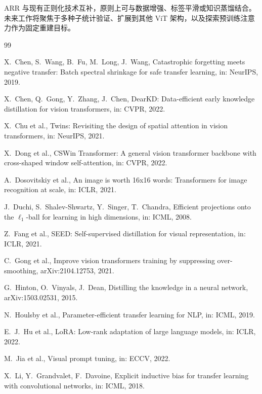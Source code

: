 \documentclass[preprint,12pt]{elsarticle}
\begin{document}
ARR 与现有正则化技术互补，原则上可与数据增强、标签平滑或知识蒸馏结合。未来工作将聚焦于多种子统计验证、扩展到其他 ViT 架构，以及探索预训练注意力作为固定重建目标。

\begin{thebibliography}{99}

 X.~Chen, S.~Wang, B.~Fu, M.~Long, J.~Wang, Catastrophic forgetting meets negative transfer: Batch spectral shrinkage for safe transfer learning, in: NeurIPS, 2019.

 X.~Chen, Q.~Gong, Y.~Zhang, J.~Chen, DearKD: Data-efficient early knowledge distillation for vision transformers, in: CVPR, 2022.

 X.~Chu et al., Twins: Revisiting the design of spatial attention in vision transformers, in: NeurIPS, 2021.

 X.~Dong et al., CSWin Transformer: A general vision transformer backbone with cross-shaped window self-attention, in: CVPR, 2022.

 A.~Dosovitskiy et al., An image is worth 16x16 words: Transformers for image recognition at scale, in: ICLR, 2021.

 J.~Duchi, S.~Shalev-Shwartz, Y.~Singer, T.~Chandra, Efficient projections onto the $\ell_1$-ball for learning in high dimensions, in: ICML, 2008.

 Z.~Fang et al., SEED: Self-supervised distillation for visual representation, in: ICLR, 2021.

 C.~Gong et al., Improve vision transformers training by suppressing over-smoothing, arXiv:2104.12753, 2021.

 G.~Hinton, O.~Vinyals, J.~Dean, Distilling the knowledge in a neural network, arXiv:1503.02531, 2015.

 N.~Houlsby et al., Parameter-efficient transfer learning for NLP, in: ICML, 2019.

 E.~J.~Hu et al., LoRA: Low-rank adaptation of large language models, in: ICLR, 2022.

 M.~Jia et al., Visual prompt tuning, in: ECCV, 2022.

 X.~Li, Y.~Grandvalet, F.~Davoine, Explicit inductive bias for transfer learning with convolutional networks, in: ICML, 2018.


\end{thebibliography}
\end{document}
